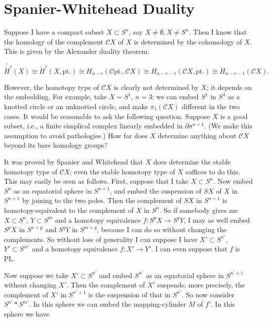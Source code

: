\documentclass[../main]{subfiles}
\begin{document}
\label{sec:p3c5}


\chapter{Spanier-Whitehead Duality}
Suppose I have a compact subset $X\subset S^n$, say $X\neq\emptyset,X\neq S^n$. Then I know that the homology of the complement $\mathcal{C} X$ of $X$ is determined by the cohomology of $X$. This is given by the Alexander duality theorem:

\begin{equation*}
    \widetilde{\check{H}^r}(X)\cong\check{H}^r(X,\mathrm{pt.})\cong H_{n-r}(\mathcal{C}\mathrm{pt.},\mathcal{C}X)\cong H_{n-r-1}(\mathcal{C}X,\mathrm{pt.})\cong\check{H}_{n-r-1}(\mathcal{C}X).
\end{equation*}

However, the homotopy type of $\mathcal{C}X$ is clearly not determined by $X$; it depends on the embedding. For example, take $X=S^1$, $n=3$; we can embed $S^1$ in $S^3$ as a knotted circle or an unknotted circle, and make $\pi_1(\mathcal{C}X)$ different in the two cases. It would be reasonable to ask the following question. Suppose $X$ is a good subset, i.e., a finite simplical complex linearly embedded in $\partial\sigma^{n+1}$. (We make this assumption to avoid pathologies.) How far does $X$ determine anything about $\mathcal{C}X$ beyond its bare homology groups?

It was proved by Spanier and Whitehead that $X$ does determine the stable homotopy type of $\mathcal{C}X$; even the stable homotopy type of $X$ suffices to do this. This may easily be seen as follows. First, suppose that I take $X\subset S^n$. Now embed $S^n$ as an equatorial sphere in $S^{n+1}$, and embed the suspension of $SX$ of $X$ in $S^{n+1}$ by joining to the two poles. Then the complement of $SX$ in $S^{n+1}$ is homotopy-equivalent to the complement of $X$ in $S^n$. So if somebody gives me $X\subset S^n$, $Y\subset S^m$ and a homotopy equivalence $f\colon S^pX\longrightarrow S^qY$, I may as well embed $S^pX$ in $S^{n+p}$ and $S^qY$ in $S^{m+q}$, because I can do so without changing the complements. So without loss of generality I can suppose I have $X'\subset S^{n'}$, $Y'\subset S^{m'}$ and a homotopy equivalence $f\colon X'\longrightarrow Y'$. I can even suppose that $f$ is PL.

Now suppose we take $X'\subset S^{n'}$ and embed $S^{n'}$ as an equatorial sphere in $S^{n'+1}$ without changing $X'$. Then the complement of $X'$ suspends; more precisely, the complement of $X'$ in $S^{n'+1}$ is the suspension of that in $S^{n'}$. So now consider $S^{n'}\!\ast S^{m'}$. In this sphere we can embed the mapping-cylinder $M$ of $f'$. In this sphere we have 
\end{document}
